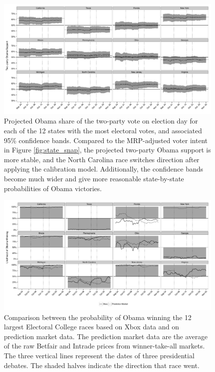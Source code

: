 \documentclass[preprint,authoryear,12pt]{elsarticle}
\begin{document}
\begin{figure}
  \centering
  \includegraphics[width=\textwidth]{projected_voteshare_state}
  \caption{Projected Obama share of the two-party vote on election day
    for each of the 12 states
    with the most electoral votes, and associated 95\% confidence
    bands. Compared to the MRP-adjusted voter intent in Figure
    \ref{fig:state_snap}, the projected two-party Obama support is more stable, and the North Carolina race switches direction after applying the
    calibration model. Additionally, the confidence bands become much wider and
    give more reasonable state-by-state probabilities of Obama victories.}
  \label{fig:proj_state}
\end{figure}

\begin{figure}
  \centering
  \includegraphics[width=\textwidth]{pred_market_xbox_comp}
  \caption{Comparison between the probability of Obama winning the 12 largest
    Electoral College races based on Xbox data and on prediction market
    data. The prediction market data are the average of the raw Betfair and Intrade
    prices from winner-take-all markets. The three vertical lines represent the
    dates of three presidential debates. The shaded halves indicate the direction
    that race went.}
  \label{fig:pm_comp}
\end{figure}
\end{document}
